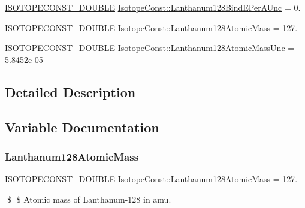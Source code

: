 \begin{DoxyCompactItemize}
\mbox{\hyperlink{group___isotope_const-_macros_ga8f45a7272ce02c0b4c65c44636ed719a}{I\+S\+O\+T\+O\+P\+E\+C\+O\+N\+S\+T\+\_\+\+D\+O\+U\+B\+LE}} \mbox{\hyperlink{group___isotope_const-_lanthanum-_la128_ga205348ba83c86c26d57280bc047d1e3b}{Isotope\+Const\+::\+Lanthanum128\+Bind\+E\+Per\+A\+Unc}} = 0.
\item 
\mbox{\hyperlink{group___isotope_const-_macros_ga8f45a7272ce02c0b4c65c44636ed719a}{I\+S\+O\+T\+O\+P\+E\+C\+O\+N\+S\+T\+\_\+\+D\+O\+U\+B\+LE}} \mbox{\hyperlink{group___isotope_const-_lanthanum-_la128_ga2caa48b23f95f4e580df36709ffdfca9}{Isotope\+Const\+::\+Lanthanum128\+Atomic\+Mass}} = 127.
\item 
\mbox{\hyperlink{group___isotope_const-_macros_ga8f45a7272ce02c0b4c65c44636ed719a}{I\+S\+O\+T\+O\+P\+E\+C\+O\+N\+S\+T\+\_\+\+D\+O\+U\+B\+LE}} \mbox{\hyperlink{group___isotope_const-_lanthanum-_la128_ga679dea25224c0f0687f33d6ac1b876d3}{Isotope\+Const\+::\+Lanthanum128\+Atomic\+Mass\+Unc}} = 5.\+8452e-\/05
\end{DoxyCompactItemize}


\subsection{Detailed Description}


\subsection{Variable Documentation}
\mbox{\label{group___isotope_const-_lanthanum-_la128_ga2caa48b23f95f4e580df36709ffdfca9}} 
\subsubsection{\texorpdfstring{Lanthanum128\+Atomic\+Mass}{Lanthanum128AtomicMass}}
{\footnotesize\ttfamily \mbox{\hyperlink{group___isotope_const-_macros_ga8f45a7272ce02c0b4c65c44636ed719a}{I\+S\+O\+T\+O\+P\+E\+C\+O\+N\+S\+T\+\_\+\+D\+O\+U\+B\+LE}} Isotope\+Const\+::\+Lanthanum128\+Atomic\+Mass = 127.}

\$ \$ Atomic mass of Lanthanum-\/128 in amu. \mbox{\label{group___isotope_const-_lanthanum-_la128_ga679dea25224c0f0687f33d6ac1b876d3}} 
